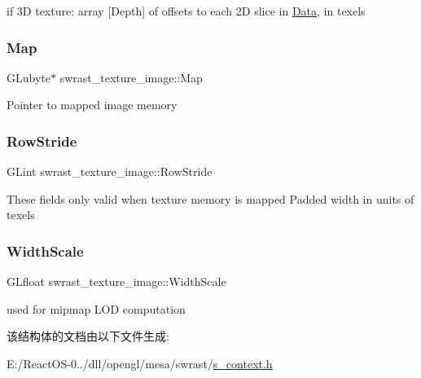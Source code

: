 if 3D texture\+: array \mbox{[}Depth\mbox{]} of offsets to each 2D slice in \textquotesingle{}\hyperlink{struct_data}{Data}\textquotesingle{}, in texels \mbox{\label{structswrast__texture__image_a0fc3eaf6b6f176c2aaa6f0a8c221e65d}} 
\subsubsection{\texorpdfstring{Map}{Map}}
{\footnotesize\ttfamily G\+Lubyte$\ast$ swrast\+\_\+texture\+\_\+image\+::\+Map}

Pointer to mapped image memory \mbox{\label{structswrast__texture__image_a7f30a547544356e195fdd06d2d79c526}} 
\subsubsection{\texorpdfstring{Row\+Stride}{RowStride}}
{\footnotesize\ttfamily G\+Lint swrast\+\_\+texture\+\_\+image\+::\+Row\+Stride}

These fields only valid when texture memory is mapped Padded width in units of texels \mbox{\label{structswrast__texture__image_a9ad1382e2571cffcc1f7ecf9e458e9c5}} 
\subsubsection{\texorpdfstring{Width\+Scale}{WidthScale}}
{\footnotesize\ttfamily G\+Lfloat swrast\+\_\+texture\+\_\+image\+::\+Width\+Scale}

used for mipmap L\+OD computation 

该结构体的文档由以下文件生成\+:\begin{DoxyCompactItemize}
\item 
E\+:/\+React\+O\+S-\/0../dll/opengl/mesa/swrast/\hyperlink{s__context_8h}{s\+\_\+context.\+h}\end{DoxyCompactItemize}
